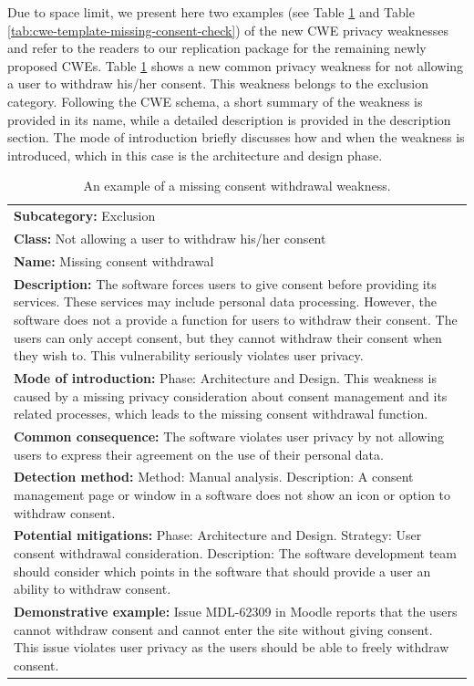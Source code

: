 Due to space limit, we present here two examples (see Table \ref{tab:cwe-template-missing-consent-withdrawal} and Table \ref{tab:cwe-template-missing-consent-check}) of the new CWE privacy weaknesses and refer to the readers to our replication package \cite{rep-pkg-privul} for the remaining newly proposed CWEs. Table \ref{tab:cwe-template-missing-consent-withdrawal} shows a new common privacy weakness for not allowing a user to withdraw his/her consent. This weakness belongs to the exclusion category. Following the CWE schema, a short summary of the weakness is provided in its name, while a detailed description is provided in the description section. The mode of introduction briefly discusses how and when the weakness is introduced, which in this case is the architecture and design phase.

\begin{table}[ht]
	\centering
	\caption{An example of a missing consent withdrawal weakness.}
	\label{tab:cwe-template-missing-consent-withdrawal}
	\begin{tabular}{|p{8.5cm}|}
		\hline
		\textbf{Subcategory:} Exclusion \\
		\textbf{Class:} Not allowing a user to withdraw his/her consent \\
		\textbf{Name:} Missing consent withdrawal  \\
		\textbf{Description:} The software forces users to give consent before providing its services. These services may include personal data processing. However, the software does not a provide a function for users to withdraw their consent. The users can only accept consent, but they cannot withdraw their consent when they wish to. This vulnerability seriously violates user privacy. \\
		\textbf{Mode of introduction:} Phase: Architecture and Design. This weakness is caused by a missing privacy consideration about consent management and its related processes, which leads to the missing consent withdrawal function. \\
		\textbf{Common consequence:} The software violates user privacy by not allowing users to express their agreement on the use of their personal data. \\
		\textbf{Detection method:} Method: Manual analysis. Description: A consent management page or window in a software does not show an icon or option to withdraw consent. \\
		\textbf{Potential mitigations:} Phase: Architecture and Design. Strategy: User consent withdrawal consideration. Description: The software development team should consider which points in the software that should provide a user an ability to withdraw consent. \\
		\textbf{Demonstrative example:} Issue MDL-62309 in Moodle reports that the users cannot withdraw consent and cannot enter the site without giving consent. This issue violates user privacy as the users should be able to freely withdraw consent. \\
		\hline
	\end{tabular}
\end{table}

